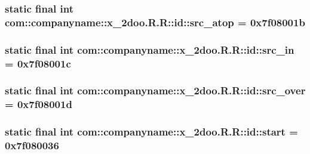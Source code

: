 \hypertarget{classcom_1_1companyname_1_1x__2doo_1_1_r_1_1id_adf9be13186e035f4064a6d88b00dd04}{
\subsubsection[{src\_\-atop}]{\setlength{\rightskip}{0pt plus 5cm}static final int com::companyname::x\_\-2doo.R.R::id::src\_\-atop = 0x7f08001b}}
\label{classcom_1_1companyname_1_1x__2doo_1_1_r_1_1id_adf9be13186e035f4064a6d88b00dd04}


\hypertarget{classcom_1_1companyname_1_1x__2doo_1_1_r_1_1id_4f2d0b2adde1f183e575eb3457832b8a}{
\subsubsection[{src\_\-in}]{\setlength{\rightskip}{0pt plus 5cm}static final int com::companyname::x\_\-2doo.R.R::id::src\_\-in = 0x7f08001c}}
\label{classcom_1_1companyname_1_1x__2doo_1_1_r_1_1id_4f2d0b2adde1f183e575eb3457832b8a}


\hypertarget{classcom_1_1companyname_1_1x__2doo_1_1_r_1_1id_2960bd2768c1a8b13709f64b4dddbfa8}{
\subsubsection[{src\_\-over}]{\setlength{\rightskip}{0pt plus 5cm}static final int com::companyname::x\_\-2doo.R.R::id::src\_\-over = 0x7f08001d}}
\label{classcom_1_1companyname_1_1x__2doo_1_1_r_1_1id_2960bd2768c1a8b13709f64b4dddbfa8}


\hypertarget{classcom_1_1companyname_1_1x__2doo_1_1_r_1_1id_a25f0710897c5fef88ce66abcb74e7a6}{
\subsubsection[{start}]{\setlength{\rightskip}{0pt plus 5cm}static final int com::companyname::x\_\-2doo.R.R::id::start = 0x7f080036}}
\label{classcom_1_1companyname_1_1x__2doo_1_1_r_1_1id_a25f0710897c5fef88ce66abcb74e7a6}


